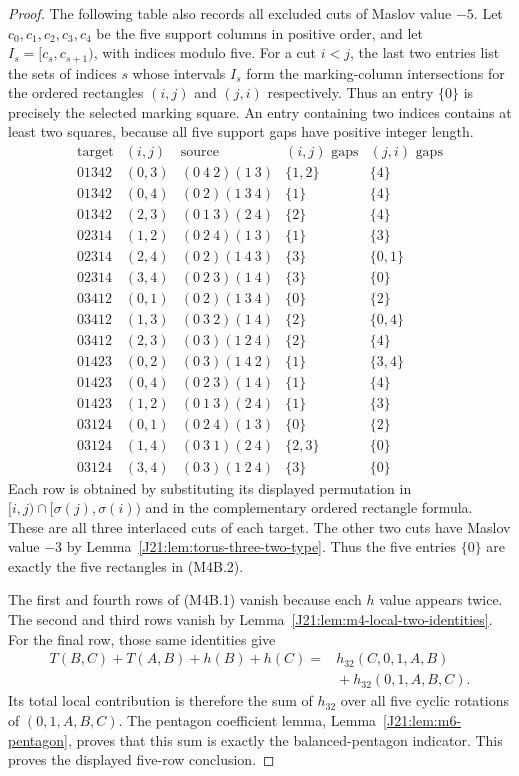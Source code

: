 \documentclass[11pt,oneside]{report}
\theoremstyle{definition}
\numberwithin{equation}{section}
\begin{document}
\begin{proof}
The following table also records all excluded cuts of Maslov value $-5$.
Let $c_0,c_1,c_2,c_3,c_4$ be the five support columns in positive order,
and let $I_s=[c_s,c_{s+1})$, with indices modulo five.
For a cut $i<j$, the last two entries list the sets of indices $s$ whose
intervals $I_s$ form the marking-column intersections for the ordered
rectangles $(i,j)$ and $(j,i)$ respectively. Thus an entry $\{0\}$
is precisely the selected marking square. An entry containing two
indices contains at least two squares, because all five support gaps
have positive integer length.
\[
\begin{array}{c|c|c|c|c}
 \text{target}&(i,j)&\text{source}&(i,j)\text{ gaps}&(j,i)\text{ gaps}\\\hline
 01342&(0,3)&(0\ 4\ 2)(1\ 3)&\{1,2\}&\{4\}\\
 01342&(0,4)&(0\ 2)(1\ 3\ 4)&\{1\}&\{4\}\\
 01342&(2,3)&(0\ 1\ 3)(2\ 4)&\{2\}&\{4\}\\
 02314&(1,2)&(0\ 2\ 4)(1\ 3)&\{1\}&\{3\}\\
 02314&(2,4)&(0\ 2)(1\ 4\ 3)&\{3\}&\{0,1\}\\
 02314&(3,4)&(0\ 2\ 3)(1\ 4)&\{3\}&\{0\}\\
 03412&(0,1)&(0\ 2)(1\ 3\ 4)&\{0\}&\{2\}\\
 03412&(1,3)&(0\ 3\ 2)(1\ 4)&\{2\}&\{0,4\}\\
 03412&(2,3)&(0\ 3)(1\ 2\ 4)&\{2\}&\{4\}\\
 01423&(0,2)&(0\ 3)(1\ 4\ 2)&\{1\}&\{3,4\}\\
 01423&(0,4)&(0\ 2\ 3)(1\ 4)&\{1\}&\{4\}\\
 01423&(1,2)&(0\ 1\ 3)(2\ 4)&\{1\}&\{3\}\\
 03124&(0,1)&(0\ 2\ 4)(1\ 3)&\{0\}&\{2\}\\
 03124&(1,4)&(0\ 3\ 1)(2\ 4)&\{2,3\}&\{0\}\\
 03124&(3,4)&(0\ 3)(1\ 2\ 4)&\{3\}&\{0\}
\end{array}
\tag{M4B.2a}
\]
Each row is obtained by substituting its displayed permutation in
$[i,j)\cap[\sigma(j),\sigma(i))$ and in the complementary ordered
rectangle formula. These are all three interlaced cuts of each target.
The other two cuts have Maslov value $-3$ by
Lemma~\ref{J21:lem:torus-three-two-type}. Thus the five entries $\{0\}$
are exactly the five rectangles in (M4B.2).

The first and fourth rows of (M4B.1) vanish because each $h$ value
appears twice. The second and third rows vanish by
Lemma~\ref{J21:lem:m4-local-two-identities}.
For the final row, those same identities give
\begin{align*}
 T(B,C)+T(A,B)+h(B)+h(C)
   ={}&h_{32}(C,0,1,A,B)\\
      &{}+h_{32}(0,1,A,B,C).
\end{align*}
Its total local contribution is therefore the sum of $h_{32}$ over
all five cyclic rotations of $(0,1,A,B,C)$.
The pentagon coefficient lemma, Lemma~\ref{J21:lem:m6-pentagon}, proves
that this sum is exactly the balanced-pentagon indicator. This proves
the displayed five-row conclusion.
\end{proof}
\end{document}
